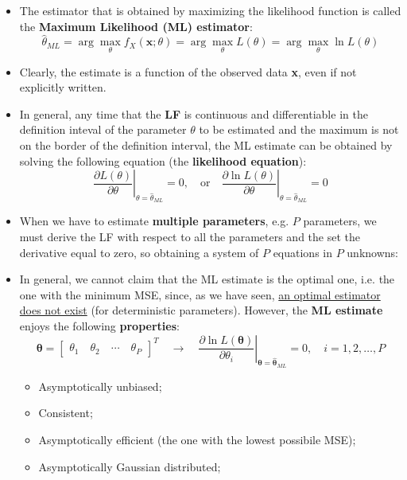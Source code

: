 \begin{itemize}
    \[
    L(\theta)\triangleq f_X(\mathbf{x};\theta)\qquad\ln L(\theta)\triangleq\ln f_X(\mathbf{x};\theta)
    \]
    \item The estimator that is obtained by maximizing the likelihood function is called the \textbf{Maximum Likelihood (ML) estimator}:
    \[
    \hat{\theta}_{ML} = \arg\max_{\theta} f_X(\mathbf{x}; \theta) = \arg\max_{\theta} L(\theta) = \arg\max_{\theta} \ln L(\theta)
    \]
    \item Clearly, the estimate is a function of the observed data \textbf{x}, even if not explicitly written.
    \item In general, any time that the \textbf{LF} is continuous and differentiable in the definition inteval of the parameter \(\theta\) to be estimated and the maximum is not on the border of the definition interval, the ML estimate can be obtained by solving the following equation (the \textbf{likelihood equation}):\[
    \left. \frac{\partial L(\theta)}{\partial \theta} \right|_{\theta = \hat{\theta}_{ML}} = 0, \quad \text{or} \quad \left. \frac{\partial \ln L(\theta)}{\partial \theta} \right|_{\theta = \hat{\theta}_{ML}} = 0
    \]
    \item When we have to estimate \textbf{multiple parameters}, e.g. \(P\) parameters, we must derive the LF with respect to all the parameters and the set the derivative equal to zero, so obtaining a system of \(P\) equations in \(P\) unknowns:
    \item In general, we cannot claim that the ML estimate is the optimal one, i.e. the one with the minimum MSE, since, as we have seen, \underline{an optimal estimator does not exist} (for deterministic parameters). However, the \textbf{ML estimate} enjoys the following \textbf{properties}:
    \[
    \boldsymbol{\theta} = 
    \begin{bmatrix}
    \theta_1 \quad \theta_2 \quad \cdots \quad \theta_P
    \end{bmatrix}^T
    \quad \rightarrow \quad
    \left. 
    \frac{\partial \ln L(\boldsymbol{\theta})}{\partial \theta_i}
    \right|_{\boldsymbol{\theta} = \hat{\boldsymbol{\theta}}_{ML}}
    = 0, \quad i=1,2,\ldots,P
    \]
    \begin{itemize}
        \item Asymptotically unbiased;
        \item Consistent;
        \item Asymptotically efficient (the one with the lowest possibile MSE);
        \item Asymptotically Gaussian distributed;

\end{itemize}
\end{itemize}
